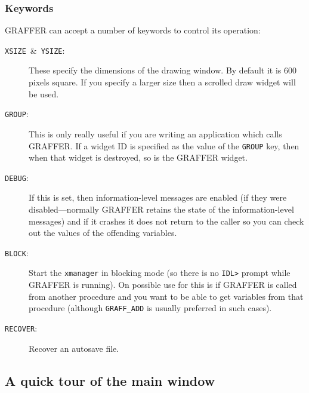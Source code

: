 \documentclass[11pt,twoside,english]{article}
\begin{document}
\subsubsection{Keywords}

GRAFFER can accept a number of keywords to control its operation:

\begin{description}

\item [\texttt{XSIZE}~\&~\texttt{YSIZE}:]These specify the dimensions
  of the drawing window. By default it is 600 pixels square. If you
  specify a larger size then a scrolled draw widget will be used.

\item [\texttt{GROUP}:]This is only really useful if you are writing an
  application which calls GRAFFER. If a widget ID is specified as the
  value of the \texttt{GROUP} key, then when that widget is destroyed,
  so is the GRAFFER widget.
\item [\texttt{DEBUG}:]If this is set, then information-level messages
  are enabled (if they were disabled---normally GRAFFER retains the
  state of the information-level messages) and if it crashes it does
  not return to the caller so you can check out the values of the
  offending variables.
\item[\texttt{BLOCK}:] Start the \texttt{xmanager} in blocking mode (so
  there is no \texttt{IDL>} prompt while GRAFFER is running). On
  possible use for this is if GRAFFER is called from another procedure
  and you want to be able to get variables from that procedure
  (although \texttt{GRAFF\_ADD} is usually preferred in such cases).
\item[\texttt{RECOVER}:] Recover an autosave file.
\end{description}

\subsection{A quick tour of the main window}
\end{document}
